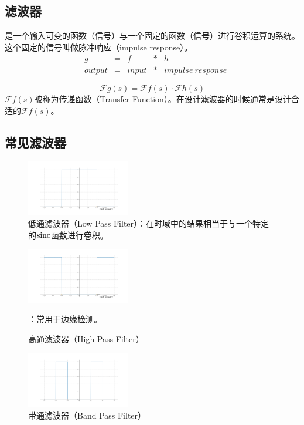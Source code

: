 \subsection{滤波器}
是一个输入可变的函数（信号）与一个固定的函数（信号）进行卷积运算的系统。这个固定的信号叫做脉冲响应（impulse response）。
\begin{align*}
	 & g      & = & f     & * & h                 \\
	 & output & = & input & * & impulse\ response
\end{align*}

$$
	\mathcal{F}g(s)=\mathcal{F}f(s)\cdot \mathcal{F}h(s)
$$
$\mathcal{F}f(s)$被称为传递函数（Transfer Function）。在设计滤波器的时候通常是设计合适的$\mathcal{F}f(s)$。
\subsection{常见滤波器}
\begin{figure}[H]
	\centering
	\includegraphics[width=0.4\textwidth]{assets/Figure_5.png}
	\caption{低通滤波器（Low Pass Filter）：在时域中的结果相当于与一个特定的$\operatorname{sinc}$函数进行卷积。}
\end{figure}
\begin{figure}[H]
	\centering
	\includegraphics[width=0.4\textwidth]{assets/Figure_6.png}
	\caption{高通滤波器（High Pass Filter）}：常用于边缘检测。
\end{figure}
\begin{figure}[H]
	\centering
	\includegraphics[width=0.4\textwidth]{assets/Figure_7.png}
	\caption{带通滤波器（Band Pass Filter）}
\end{figure}
